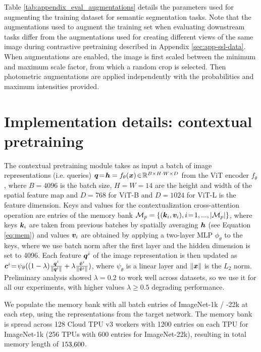 \documentclass{article}
\begin{document}
Table \ref{tab:appendix_eval_augmentations} details the parameters used for augmenting the training dataset for semantic segmentation tasks. Note that the augmentations used to augment the training set when evaluating downstream tasks differ from the augmentations used for creating different views of the same image during contrastive pretraining described in Appendix \ref{sec:app-ssl-data}. When augmentations are enabled, the image is first scaled between the minimum and maximum scale factor, from which a random crop is selected. Then photometric augmentations are applied independently with the probabilities and maximum intensities provided.



\section{Implementation details: contextual pretraining}
\label{sec:app-con-rep}

The contextual pretraining module takes as input a batch of image representations (i.e. queries) ${\bm{q}} \!=\! {\bm{h}} = f_\theta({\bm{x}}) \!\in\! \mathbb{R}^{B \times H \cdot W \times D}$ from the ViT encoder $f_\theta$, where $B\!=\!4096$ is the batch size, $H\!=\!W\!=\!14$ are the height and width of the spatial feature map and $D\!=\!768$ for ViT-B and $D\!=\!1024$ for ViT-L is the feature dimension. Keys and values for the contextualization cross-attention operation are entries of the memory bank $\mathcal{M}_p = \{ ({\bm{k}}_i, {\bm{v}}_i), i\!=\!1,...,|\mathcal{M}_p| \}$, where keys ${\bm{k}}_i$ are taken from previous batches by spatially averaging ${\bm{h}}$ (see Equation \ref{eq:mem}) and values ${\bm{v}}_i$ are obtained by applying a two-layer MLP $\phi_\theta$ to the keys, where we use batch norm after the first layer and the hidden dimension is set to 4096. Each feature ${\bm{q}}^i$ of the image representation is then updated as $ \bm{c}^{i} \!=\! \psi_\theta((1-\lambda) \frac{{\bm{q}}^i}{ \lVert {\bm{q}}^i \rVert } + \lambda \frac{\bm{\hat{v}}^{i}}{ \lVert \bm{\hat{v}}^{i} \rVert } )$, where $\psi_\theta$ is a linear layer and $\lVert {\bm{x}} \rVert$ is the $L_2$ norm. Preliminary analysis showed $\lambda\!=\!0.2$ to work well across datasets, so we use it for all our experiments, with higher values $\lambda \!\ge\! 0.5$ degrading performance.

We populate the memory bank with all batch entries of ImageNet-1k / -22k at each step, using the representations from the target network. The memory bank is spread across 128 Cloud TPU v3 workers with 1200 entries on each TPU for ImageNet-1k (256 TPUs with 600 entries for ImageNet-22k), resulting in total memory length of $153{\small,}600$.
\end{document}
